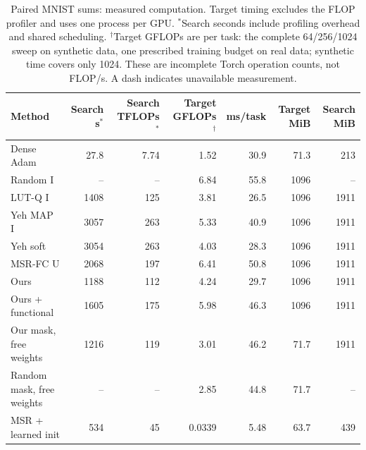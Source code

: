 \begin{table}[htbp]
\centering\small\setlength{\tabcolsep}{3.5pt}
\begin{tabular}{lrrrrrr}
\toprule
Method & Search s$^*$ & Search TFLOPs$^*$ & Target GFLOPs$^\dagger$ & ms/task & Target MiB & Search MiB\\
\midrule
Dense Adam & 27.8 & 7.74 & 1.52 & 30.9 & 71.3 & 213\\
Random I & -- & -- & 6.84 & 55.8 & 1096 & --\\
LUT-Q I & 1408 & 125 & 3.81 & 26.5 & 1096 & 1911\\
Yeh MAP I & 3057 & 263 & 5.33 & 40.9 & 1096 & 1911\\
Yeh soft & 3054 & 263 & 4.03 & 28.3 & 1096 & 1911\\
MSR-FC U & 2068 & 197 & 6.41 & 50.8 & 1096 & 1911\\
Ours & 1188 & 112 & 4.24 & 29.7 & 1096 & 1911\\
Ours + functional & 1605 & 175 & 5.98 & 46.3 & 1096 & 1911\\
Our mask, free weights & 1216 & 119 & 3.01 & 46.2 & 71.7 & 1911\\
Random mask, free weights & -- & -- & 2.85 & 44.8 & 71.7 & --\\
MSR + learned init & 534 & 45 & 0.0339 & 5.48 & 63.7 & 439\\
\bottomrule\end{tabular}
\caption{Paired MNIST sums: measured computation. Target timing excludes the FLOP profiler and uses one process per GPU. $^*$Search seconds include profiling overhead and shared scheduling. $^\dagger$Target GFLOPs are per task: the complete 64/256/1024 sweep on synthetic data, one prescribed training budget on real data; synthetic time covers only 1024. These are incomplete Torch operation counts, not FLOP/s. A dash indicates unavailable measurement.}
\end{table}
